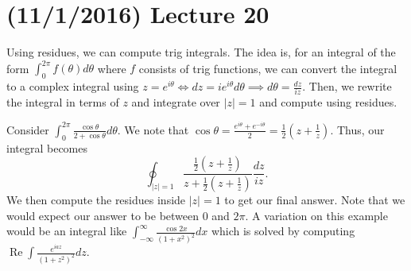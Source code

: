 \documentclass[11pt,leqno,oneside]{amsart}
\numberwithin{thm}{section}
\renewcommand{\Re}{\operatorname{Re}}
\begin{document}
  \section{(11/1/2016) Lecture 20}
  Using residues, we can compute trig integrals. The idea is, for an
  integral of the form $\int_0^{2\pi} f(\theta) d\theta$ where $f$
  consists of trig functions, we can convert the integral to a complex
  integral using $z = e^{i \theta} \iff dz = ie^{i \theta}d\theta
  \implies d\theta = \frac{dz}{iz}$. Then, we rewrite the integral in
  terms of $z$ and integrate over $|z|=1$ and compute using residues.
  \begin{example}
    Consider $\int_0^{2\pi} \frac{\cos \theta}{2+\cos \theta}
    d\theta$. We note that $\cos \theta = \frac{e^{i \theta} + e^{-i
        \theta}}{2} = \frac{1}{2}(z+\frac{1}{z})$. Thus, our integral
    becomes \[\oint_{|z|=1}
    \frac{\frac{1}{2}(z+\frac{1}{z})}{z+\frac{1}{2}(z+\frac{1}{z})}
    \frac{dz}{iz}.\]
    We then compute the residues inside $|z|=1$ to get our final
    answer. Note that we would expect our answer to be between 0 and
    $2\pi$. A variation on this example would be an integral like
    $\int_{-\infty}^\infty \frac{\cos 2x}{(1+x^2)^2} dx$ which is
    solved by computing $\Re \int \frac{e^{iaz}}{(1+z^2)^2}dz$.
  \end{example}
\end{document}
